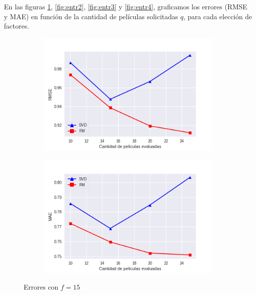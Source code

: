 \documentclass[hidelinks,12pt,a4paper]{book}
\theoremstyle{plain}
\theoremstyle{definition}
\begin{document}
En las figuras \ref{fig:entr1}, \ref{fig:entr2}, \ref{fig:entr3} y \ref{fig:entr4}, graficamos los errores (RMSE y MAE) en función de la cantidad de películas solicitadas $q$, para cada elección de factores. 

\begin{figure}[ht]
\centering
    \begin{subfigure}[b]{0.5\textwidth}            
            \includegraphics[width=\textwidth]{graficos/entr-15-rmse.png}
    \end{subfigure}%
    \begin{subfigure}[b]{0.5\textwidth}
            \centering
            \includegraphics[width=\textwidth]{graficos/entr-15-mae.png}
    \end{subfigure}
    \caption{Errores con $f=15$}\label{fig:entr1}
\end{figure}
\end{document}
